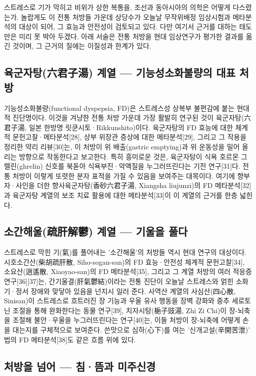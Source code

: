 \documentclass[12pt,oneside]{book}
\begin{document}
스트레스로 기가 막히고 비위가 상한 복통을, 조선과 동아시아의 의학은 어떻게 다스렸는가. 놀랍게도 이 전통 처방들 가운데 상당수가 오늘날 무작위배정 임상시험과 메타분석의 대상이 되어, 그 효능과 안전성이 검토되고 있다. 다만 여기서 근거를 대하는 태도만은 미리 못 박아 두겠다. 아래 서술은 전통 처방을 현대 임상연구가 평가한 결과를 옮긴 것이며, 그 근거의 질에는 이질성과 한계가 있다.

\subsection{육군자탕(六君子湯) 계열 — 기능성소화불량의 대표 처방}

기능성소화불량(functional dyspepsia, FD)은 스트레스성 상복부 불편감에 붙는 현대적 진단명이다. 이것을 겨냥한 전통 처방 가운데 가장 활발히 연구된 것이 육군자탕(六君子湯, 일본 한방명 릿쿤시토·Rikkunshito)이다. 육군자탕의 FD 효능에 대한 체계적 문헌고찰·메타분석[28], 상부 위장관 증상에 대한 메타분석[29], 그리고 그 작용을 정리한 약리 리뷰[30]는, 이 처방이 위 배출(gastric emptying)과 위 운동성을 밀어 올리는 방향으로 작동한다고 보고한다. 특히 흥미로운 것은, 육군자탕이 식욕 호르몬 그렐린(ghrelin) 신호를 북돋아 식욕부진·악액질을 누그러뜨린다는 기전 연구[31]다. 전통 처방이 이렇게 또렷한 분자 표적을 가질 수 있음을 보여주는 대목이다. 여기에 향부자·사인을 더한 향사육군자탕(香砂六君子湯, Xiangsha liujunzi)의 FD 메타분석[32]과 육군자탕 계열의 보조 치료 활용에 대한 메타분석[33]이 이 계열의 근거를 한층 넓힌다.

\subsection{소간해울(疏肝解鬱) 계열 — 기울을 풀다}

스트레스로 막힌 기(氣)를 풀어내는 '소간해울'의 처방들 역시 현대 연구의 대상이다. 시호소간산(柴胡疏肝散, Siho-sogan-san)의 FD 효능·안전성 체계적 문헌고찰[34], 소요산(逍遙散, Xiaoyao-san)의 FD 메타분석[35], 그리고 그 계열 처방의 여러 적응증 연구[36][37]는, 간기울결(肝氣鬱結)이라는 전통 진단이 오늘날 스트레스와 얽힌 소화기·정서 장애와 맞닿아 있음을 넌지시 일러 준다. 사역산 계열의 사심산(四心散, Sinisan)이 스트레스로 흐트러진 장 기능과 우울 유사 행동을 장벽 강화와 중추 세로토닌 조절을 통해 완화한다는 동물 연구[39], 치자시탕(梔子豉湯, Zhi Zi Chi)이 장-뇌축을 조절해 불안·우울을 누그러뜨린다는 연구[40]는, 이들 처방이 장-뇌축에 어떻게 손을 대는지를 구체적으로 보여준다. 쓴맛으로 심하(心下)를 여는 '신개고설(辛開苦泄)' 법의 FD 메타분석[38]도 같은 흐름 위에 있다.

\subsection{처방을 넘어 — 침·뜸과 미주신경}
\end{document}

